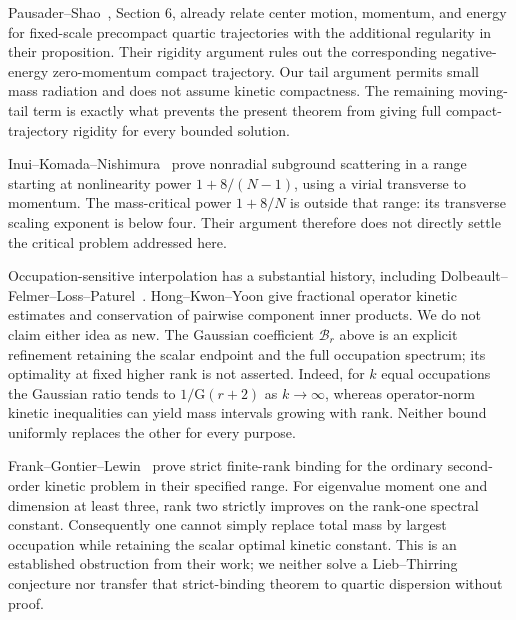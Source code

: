 \documentclass[11pt,a4paper]{article}
\theoremstyle{remark}\newtheorem{remark}[theorem]{Remark}
\begin{document}
Pausader--Shao~\cite{PS}, Section 6, already relate center motion,
momentum, and energy for fixed-scale precompact quartic trajectories
with the additional regularity in their proposition. Their rigidity
argument rules out the corresponding negative-energy zero-momentum
compact trajectory. Our tail argument permits small mass radiation
and does not assume kinetic compactness. The remaining moving-tail
term is exactly what prevents the present theorem from giving full
compact-trajectory rigidity for every bounded solution.

Inui--Komada--Nishimura~\cite{IKN} prove nonradial subground scattering
in a range starting at nonlinearity power $1+8/(N-1)$, using a
virial transverse to momentum. The mass-critical power $1+8/N$ is
outside that range: its transverse scaling exponent is below four.
Their argument therefore does not directly settle the critical
problem addressed here.

Occupation-sensitive interpolation has a substantial history,
including Dolbeault--Felmer--Loss--Paturel~\cite{DFLP}. Hong--Kwon--Yoon
\cite{HKY} give fractional operator kinetic estimates and conservation
of pairwise component inner products. We do not claim either idea as
new. The Gaussian coefficient $\mathcal B_r$ above is an explicit
refinement retaining the scalar endpoint and the full occupation
spectrum; its optimality at fixed higher rank is not asserted.
Indeed, for $k$ equal occupations the Gaussian ratio tends to
$1/\mathrm G(r+2)$ as $k\to\infty$, whereas operator-norm kinetic
inequalities can yield mass intervals growing with rank. Neither
bound uniformly replaces the other for every purpose.

Frank--Gontier--Lewin~\cite{FGL} prove strict finite-rank binding for
the ordinary second-order kinetic problem in their specified range.
For eigenvalue moment one and dimension at least three, rank two
strictly improves on the rank-one spectral constant. Consequently
one cannot simply replace total mass by largest occupation while
retaining the scalar optimal kinetic constant. This is an established
obstruction from their work; we neither solve a Lieb--Thirring
conjecture nor transfer that strict-binding theorem to quartic
dispersion without proof.
\end{document}
